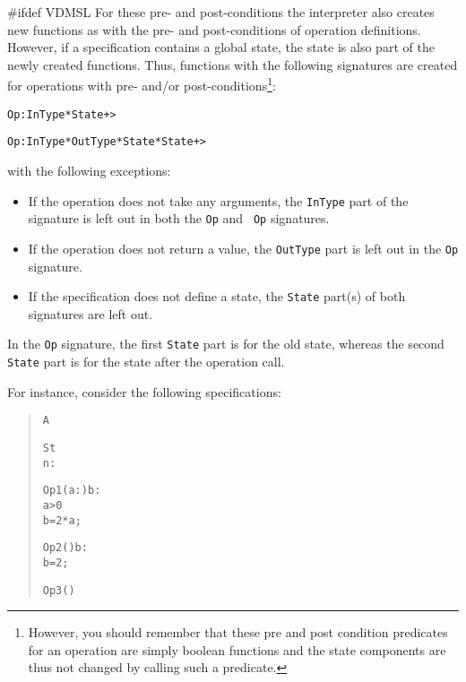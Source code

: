 \documentclass[\pformat,12pt]{article}
\begin{document}
\begin{description}
#ifdef VDMSL
For these pre- and post-conditions the interpreter also
creates new functions as with the pre- and post-conditions of operation
definitions.  However, if a specification contains a global state, the
state is also part of the newly created functions. Thus, functions
with the following signatures are created for operations with pre-
and/or post-conditions\footnote{However, you should remember that
these pre and post condition predicates for an operation are simply
boolean functions and the state components are thus not changed by
calling such a predicate.}:
\begin{alltt}
  Op : InType * State +> 

  Op : InType * OutType * State * State +> 
\end{alltt}
with the following exceptions:
\begin{itemize}
\item If the operation does not take any arguments, the {\tt InType} part
  of the signature is left out in both the {\tt {}Op} and {\tt
    Op} signatures.

\item If the operation does not return a value, the {\tt OutType} part is
  left out in the {\tt {}Op} signature.

\item If the specification does not define a state, the {\tt State} part(s)
  of both signatures are left out.
\end{itemize}

In the {\tt {}Op} signature, the first {\tt State} part is for
the old state, whereas the second {\tt State} part is for the 
state after the operation call.

For instance, consider the following specifications:

\begin{quotation}
\begin{minipage}[t]{.4\textwidth}
\begin{alltt}
 A


 St 
  n : 


Op1 (a : ) b :
 a > 0
 b = 2 * a;

Op2 () b : 
 b = 2;

Op3 ()
 


\end{alltt}
\end{minipage}
\end{quotation}
\end{description}
\end{document}
